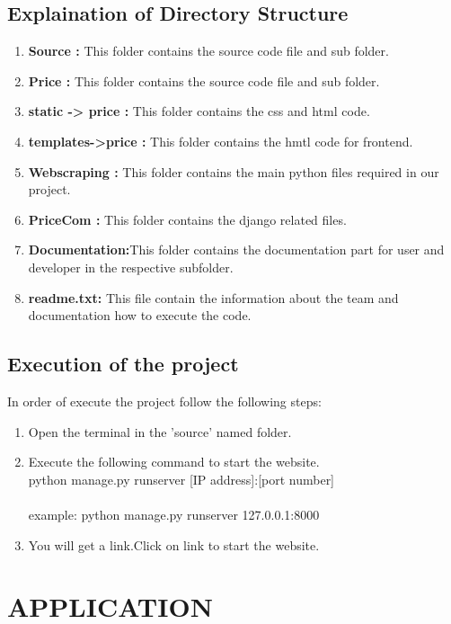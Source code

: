 \documentclass[11pt]{article}
\begin{document}
\subsection{\large{Explaination of Directory Structure}}

\begin{enumerate}
\item \textbf{Source :} This folder contains the source code file and sub folder. 
\item \textbf{Price :} This folder contains the source code file and sub folder.
\item \textbf{static -> price :} This folder contains the css and html code.
\item \textbf{templates->price :} This folder contains the hmtl code for frontend.
\item \textbf{Webscraping :} This folder contains the  main python files required in our project.
\item \textbf{PriceCom :} This folder contains the django related files.
\item \textbf{Documentation:}This folder contains the documentation part for user and developer in the respective subfolder.
\item\textbf{readme.txt: } This file contain the information about the team and documentation how to execute the code.
\end{enumerate}

\subsection{\large{Execution of the project}}
In order of execute the project follow the following steps:
\begin{enumerate}
\item Open the terminal in the 'source' named folder.
\item Execute the following command to start the website.\\
    
    python manage.py runserver [IP address]:[port number]\\ \\
    example: python manage.py runserver 127.0.0.1:8000

\item You will get a link.Click on link to start the website.

\end{enumerate}


\section{\LARGE{APPLICATION}}
\end{document}
